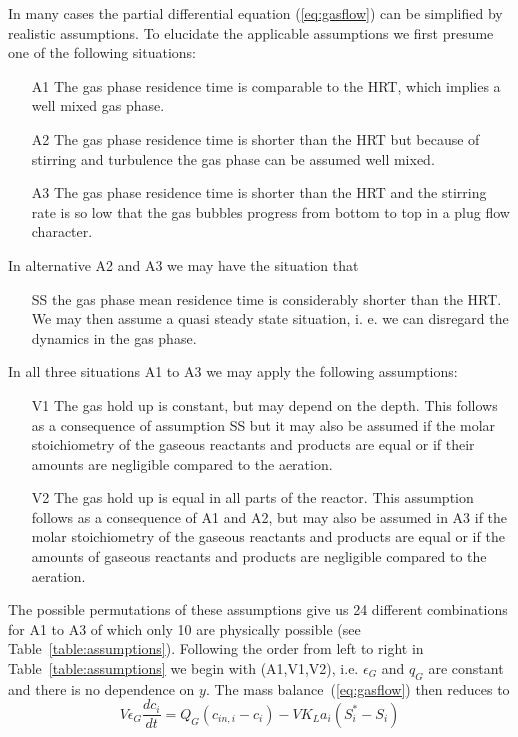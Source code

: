 In many cases the partial differential equation (\ref{eq:gasflow}) can be simplified by realistic assumptions. To elucidate the applicable assumptions we first presume one of the following situations:
\begin{enumerate}
\item[A1] The gas phase residence time is comparable to the HRT, which implies a well mixed gas phase.
\item[A2] The gas phase residence time is shorter than the HRT but because of stirring and turbulence the gas phase can be assumed well mixed.
\item[A3] The gas phase residence time is shorter than the HRT and the stirring rate is so low that the gas bubbles progress from bottom to top in a plug flow character.
\end{enumerate}
In alternative A2 and A3 we may have the situation that
\begin{enumerate}
\item[SS] the gas phase mean residence time is considerably shorter than the HRT. We may then assume a quasi steady state situation, i. e. we can disregard the dynamics in the gas phase.
\end{enumerate}
In all three situations A1 to A3 we may apply the following assumptions:
\begin{enumerate}
\item[V1] The gas hold up is constant, but may depend on the depth. This follows as a consequence of assumption SS but it may also be assumed if the molar stoichiometry of the gaseous reactants and products are equal or if their amounts are negligible compared to the aeration.
\item[V2] The gas hold up is equal in all parts of the reactor. This assumption follows as a consequence of A1 and A2, but may also be assumed in A3 if the molar stoichiometry of the gaseous reactants and products are equal or if the amounts of gaseous reactants and products are negligible compared to the aeration.
\end{enumerate}
The possible permutations of these assumptions give us 24 different combinations for A1 to A3 of which only 10 are physically possible (see Table~\ref{table:assumptions}). Following the order from left to right in Table~\ref{table:assumptions} we begin with (A1,V1,V2), i.e. $\epsilon_G$ and $q_G$ are constant and there is no dependence on $y$. The mass balance~(\ref{eq:gasflow}) then reduces to
\begin{equation}\label{eq:A1V1V2}
V\epsilon_G\frac{dc_i}{dt}=Q_G(c_{in,i}-c_i)-VK_La_i(S_i^\ast-S_i)
\end{equation}

